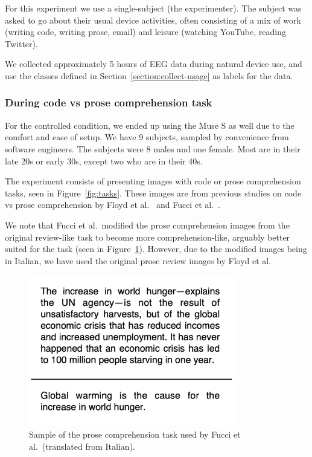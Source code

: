             For this experiment we use a single-subject (the experimenter). The subject was asked to go about their usual device activities, often consisting of a mix of work (writing code, writing prose, email) and leisure (watching YouTube, reading Twitter).
            
            We collected approximately 5 hours of EEG data during natural device use, and use the classes defined in Section~\ref{section:collect-usage} as labels for the data.

        \subsubsection*{During code vs prose comprehension task}

            For the controlled condition, we ended up using the Muse S as well due to the comfort and ease of setup. We have 9 subjects, sampled by convenience from software engineers. The subjects were 8 males and one female. Most are in their late 20s or early 30s, except two who are in their 40s.

            The experiment consists of presenting images with code or prose comprehension tasks, seen in Figure~\ref{fig:tasks}. These images are from previous studies on code vs prose comprehension by Floyd et al.~\cite{floyd_decoding_2017} and Fucci et al.~\cite{fucci_replication_2019}. 

            

            We note that Fucci et al.~modified the prose comprehension images from the original review-like task to become more comprehension-like, arguably better suited for the task (seen in Figure~\ref{fig:prose-comp-fucci}). However, due to the modified images being in Italian, we have used the original prose review images by Floyd et al.

            \begin{figure}[H]
                \centering
                \includegraphics[width=90mm]{img/prose-comprehension.png}
                \caption{Sample of the prose comprehension task used by Fucci et al.\ (translated from Italian).}\label{fig:prose-comp-fucci}
            \end{figure}

